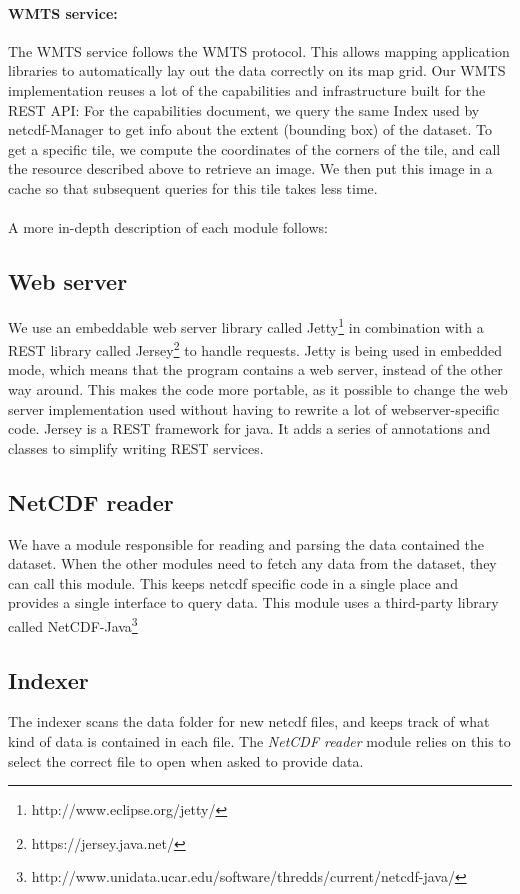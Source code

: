 \documentclass[11pt,a4paper,titlepage,oneside]{report}
\begin{document}
\paragraph{WMTS service:}
The WMTS service follows the WMTS protocol\cite{WMTS:spec}.
This allows mapping application libraries to automatically lay out the data correctly on its map grid.  
Our WMTS implementation reuses a lot of the capabilities and infrastructure built for the REST API:  
For the capabilities document, we query the same Index used by \gls{netcdf}-Manager to get info about the extent (bounding box) of the dataset.
To get a specific tile, we compute the coordinates of the corners of the tile, and call the resource described above to retrieve an image.
We then put this image in a cache so that subsequent queries for this tile takes less time.

\paragraph{}
A more in-depth description of each module follows:

\subsection{Web server}
We use an embeddable web server library called Jetty\footnote{http://www.eclipse.org/jetty/} in combination with a REST library called Jersey\footnote{https://jersey.java.net/} to handle requests.
Jetty is being used in embedded mode, which means that the program contains a web server, instead of the other way around. This makes the code more portable, as it possible to change the web server implementation used without having to rewrite a lot of webserver-specific code.
Jersey is a REST framework for java. It adds a series of annotations and classes to simplify writing REST services.

\subsection{NetCDF reader}
We have a module responsible for reading and parsing the data contained the dataset. When the other modules need to fetch any data from the dataset, they can call this module. This keeps \gls{netcdf} specific code in a single place and provides a single interface to query data.
This module uses a third-party library called NetCDF-Java\footnote{http://www.unidata.ucar.edu/software/thredds/current/netcdf-java/}
\subsection{Indexer}
The indexer scans the data folder for new \gls{netcdf} files, and keeps track of what kind of data is contained in each file. The \textit{NetCDF reader} module relies on this to select the correct file to open when asked to provide data.
\end{document}
